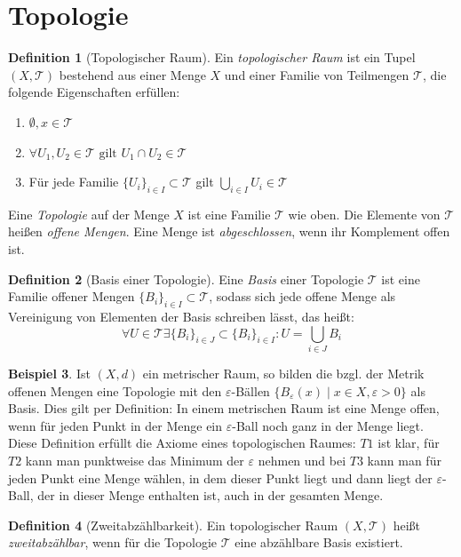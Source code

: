 \documentclass[a4paper]{scrbook}
\numberwithin{equation}{chapter}
\theoremstyle{definition}
\newtheorem{defn}{Definition}[section]
\newtheorem{bsp}[defn]{Beispiel}
\begin{document}
	\section{Topologie}
		\begin{defn}[Topologischer Raum]
			Ein \emph{topologischer Raum} ist ein Tupel $(X,\mathcal{T})$ bestehend aus einer Menge $X$ und einer Familie von Teilmengen $\mathcal{T}$, die folgende Eigenschaften erfüllen:
			\begin{enumerate}[label=(\roman*)]
				\item $\emptyset, x\in \mathcal{T}$
				\item $\forall U_1, U_2\in \mathcal{T} \text{ gilt }U_1\cap U_2\in\mathcal{T}$
				\item Für jede Familie $\lbrace U_i\rbrace_{i\in I}\subset \mathcal{T}$ gilt $\bigcup_{i\in I}U_i\in\mathcal{T}$
			\end{enumerate}
			Eine \emph{Topologie} auf der Menge $X$ ist eine Familie $\mathcal{T}$ wie oben. Die Elemente von $\mathcal{T}$ heißen \emph{offene Mengen}. Eine Menge ist \emph{abgeschlossen}, wenn ihr Komplement offen ist.
		\end{defn}
		\begin{defn}[Basis einer Topologie]
			Eine \emph{Basis} einer Topologie $\mathcal{T}$ ist eine Familie offener Mengen $\lbrace B_i\rbrace_{i\in I}\subset \mathcal{T}$, sodass sich jede offene Menge als Vereinigung von Elementen der Basis schreiben lässt, das heißt:
			\begin{equation*}
				\forall U\in\mathcal{T}\exists \lbrace B_i\rbrace_{i\in J}\subset \lbrace B_i\rbrace_{i\in I}: U=\bigcup_{i\in J}B_i
			\end{equation*}
		\end{defn}
		\begin{bsp}
			Ist $(X,d)$ ein metrischer Raum, so bilden die bzgl. der Metrik offenen Mengen eine Topologie mit den $\varepsilon$-Bällen $\lbrace B_{\varepsilon}(x)\mid x\in X, \varepsilon >0\rbrace$ als Basis. Dies gilt per Definition: In einem metrischen Raum ist eine Menge offen, wenn für jeden Punkt in der Menge ein $\varepsilon$-Ball noch ganz in der Menge liegt. Diese Definition erfüllt die Axiome eines topologischen Raumes: $T1$ ist klar, für $T2$ kann man punktweise das Minimum der $\varepsilon$ nehmen und bei $T3$ kann man für jeden Punkt eine Menge wählen, in dem dieser Punkt liegt und dann liegt der $\varepsilon$-Ball, der in dieser Menge enthalten ist, auch in der gesamten Menge.
		\end{bsp}
		\begin{defn}[Zweitabzählbarkeit]
			Ein topologischer Raum $(X,\mathcal{T})$ heißt \emph{zweitabzählbar}, wenn für die Topologie $\mathcal{T}$ eine abzählbare Basis existiert. 
		\end{defn}
\end{document}
